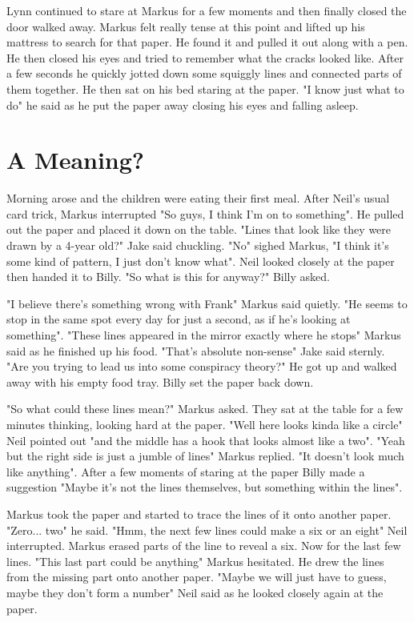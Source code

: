 \documentclass[12pt]{book}
\begin{document}
Lynn continued to stare at Markus for a few moments and then finally closed the door walked away. Markus felt really tense at this point and lifted up his mattress to search for that paper. He found it and pulled it out along with a pen. He then closed his eyes and tried to remember what the cracks looked like. After a few seconds he quickly jotted down some squiggly lines and connected parts of them together. He then sat on his bed staring at the paper. "I know just what to do" he said as he put the paper away closing his eyes and falling asleep.

\chapter{A Meaning?}

Morning arose and the children were eating their first meal. After Neil's usual card trick, Markus interrupted "So guys, I think I'm on to something". He pulled out the paper and placed it down on the table. "Lines that look like they were drawn by a 4-year old?" Jake said chuckling. "No" sighed Markus, "I think it's some kind of pattern, I just don't know what". Neil looked closely at the paper then handed it to Billy. "So what is this for anyway?" Billy asked.

"I believe there's something wrong with Frank" Markus said quietly. "He seems to stop in the same spot every day for just a second, as if he's looking at something". "These lines appeared in the mirror exactly where he stops" Markus said as he finished up his food. "That's absolute non-sense" Jake said sternly. "Are you trying to lead us into some conspiracy theory?" He got up and walked away with his empty food tray. Billy set the paper back down.

"So what could these lines mean?" Markus asked. They sat at the table for a few minutes thinking, looking hard at the paper. "Well here looks kinda like a circle" Neil pointed out "and the middle has a hook that looks almost like a two". "Yeah but the right side is just a jumble of lines" Markus replied. "It doesn't look much like anything". After a few moments of staring at the paper Billy made a suggestion "Maybe it's not the lines themselves, but something within the lines".

Markus took the paper and started to trace the lines of it onto another paper. "Zero... two" he said. "Hmm, the next few lines could make a six or an eight" Neil interrupted. Markus erased parts of the line to reveal a six. Now for the last few lines. "This last part could be anything" Markus hesitated. He drew the lines from the missing part onto another paper. "Maybe we will just have to guess, maybe they don't form a number" Neil said as he looked closely again at the paper.
\end{document}
